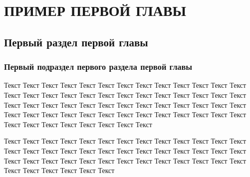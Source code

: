 \chapter{ПРИМЕР ПЕРВОЙ ГЛАВЫ}
\section{Первый раздел первой главы}
\subsection{Первый подраздел первого раздела первой главы}

Текст Текст Текст Текст Текст Текст Текст Текст Текст Текст Текст Текст Текст Текст Текст Текст Текст Текст Текст Текст Текст Текст Текст Текст Текст Текст Текст Текст Текст Текст Текст Текст Текст Текст Текст Текст Текст Текст Текст Текст Текст Текст Текст Текст Текст Текст Текст Текст Текст Текст Текст Текст Текст Текст Текст Текст Текст Текст Текст Текст 

Текст Текст Текст Текст Текст Текст Текст Текст Текст Текст Текст Текст Текст Текст Текст Текст Текст Текст Текст Текст Текст Текст Текст Текст Текст Текст Текст Текст Текст Текст Текст Текст Текст Текст Текст Текст Текст Текст Текст Текст Текст Текст Текст Текст Текст 